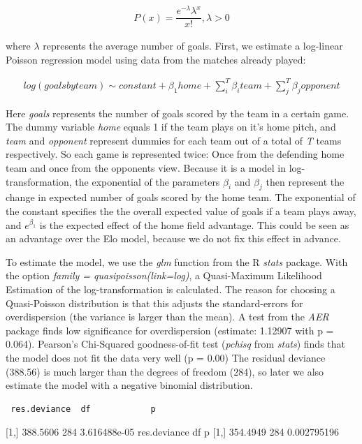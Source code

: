 \documentclass[12pt,a4paper]{article}
\begin{document}
\begin{align}
P(x) = \dfrac{e^{-\lambda}\lambda^x}{x!}, \lambda > 0
\end{align}

where \(\lambda\) represents the average number of goals. First, we
estimate a log-linear Poisson regression model using data from the
matches already played:

\begin{align}
log(goals by team) \sim constant + \beta_1 home + \sum_{i}^{T} \beta_i team + \sum_{j}^{T} \beta_j opponent
\end{align}

Here \emph{goals} represents the number of goals scored by the team in a
certain game. The dummy variable \emph{home} equals 1 if the team plays
on it's home pitch, and \emph{team} and \emph{opponent} represent
dummies for each team out of a total of \emph{T} teams respectively. So
each game is represented twice: Once from the defending home team and
once from the opponents view. Because it is a model in
log-transformation, the exponential of the parameters \(\beta_i\) and
\(\beta_j\) then represent the change in expected number of goals scored
by the home team. The exponential of the constant specifies the the
overall expected value of goals if a team plays away, and
\(e^{\beta_1}\) is the expected effect of the home field advantage. This
could be seen as an advantage over the Elo model, because we do not fix
this effect in advance.

To estimate the model, we use the \emph{glm} function from the R
\emph{stats} package. With the option \emph{family =
quasipoisson(link=log)}, a Quasi-Maximum Likelihood Estimation of the
log-transformation is calculated. The reason for choosing a
Quasi-Poisson distribution is that this adjusts the standard-errors for
overdispersion (the variance is larger than the mean). A test from the
\emph{AER} package finds low significance for overdispersion (estimate:
1.12907 with p = 0.064). Pearson's Chi-Squared goodness-of-fit test
(\emph{pchisq} from \emph{stats}) finds that the model does not fit the
data very well (p = 0.00) The residual deviance (388.56) is much larger
than the degrees of freedom (284), so later we also estimate the model
with a negative binomial distribution.

\begin{verbatim}
 res.deviance  df            p
\end{verbatim}

{[}1,{]} 388.5606 284 3.616488e-05 res.deviance df p {[}1,{]} 354.4949
284 0.002795196
\end{document}
